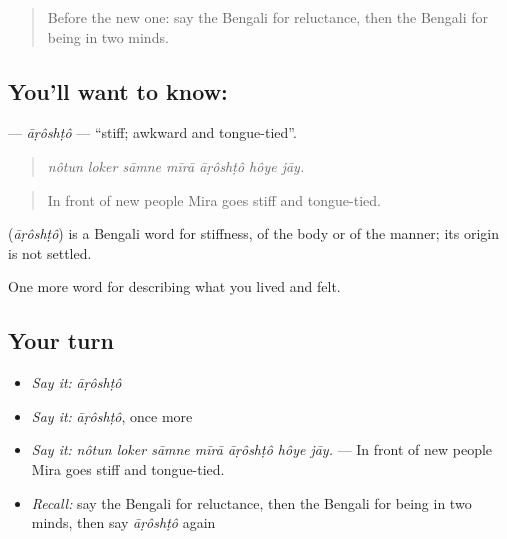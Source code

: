 \label{lesson:BN-C454-aroshto}



\begin{quote}
Before the new one: say the Bengali for reluctance, then the Bengali for being in two minds.
\end{quote}

\subsection*{You'll want to know: }
\textbf{} — \emph{āṛôshṭô} — \textquotedblleft{}stiff; awkward and tongue-tied\textquotedblright{}.

\begin{quote}
      
\end{quote}

\begin{quote}
\emph{nôtun loker sāmne mīrā āṛôshṭô hôye jāy.}
\end{quote}

\begin{quote}
In front of new people Mira goes stiff and tongue-tied.
\end{quote}

\begin{cousinweb}
\textbf{} (\emph{āṛôshṭô}) is a Bengali word for stiffness, of the body or of the manner; its origin is not settled.
\end{cousinweb}

\begin{grammarlens}[title={What you've built}]
One more word for describing what you lived and felt.
\end{grammarlens}

\subsection*{Your turn}
\begin{itemize}
\raggedright
  \item \emph{Say it:} \emph{āṛôshṭô}
  \item \emph{Say it:} \emph{āṛôshṭô}, once more
  \item \emph{Say it:} \emph{nôtun loker sāmne mīrā āṛôshṭô hôye jāy.} — In front of new people Mira goes stiff and tongue-tied.
  \item \emph{Recall:} say the Bengali for reluctance, then the Bengali for being in two minds, then say \emph{āṛôshṭô} again
\end{itemize}

